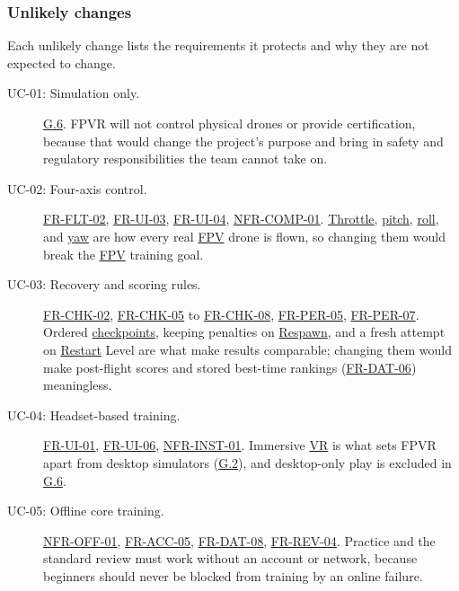 \documentclass[12pt]{article}
\begin{document}
\subsubsection*{Unlikely changes}

Each unlikely change lists the requirements it protects and why they are not
expected to change.

\begin{description}
\item[UC-01: Simulation only.] \hyperref[g6]{G.6}.
FPVR will not control physical drones or provide certification, because that
would change the project's purpose and bring in safety and regulatory
responsibilities the team cannot take on.
\item[UC-02: Four-axis control.]
\hyperlink{req:FR-FLT-02}{FR-FLT-02}, \hyperlink{req:FR-UI-03}{FR-UI-03},
\hyperlink{req:FR-UI-04}{FR-UI-04}, \hyperlink{req:NFR-COMP-01}{NFR-COMP-01}.
\hyperlink{glos:Throttle}{Throttle}, \hyperlink{glos:Throttle}{pitch}, \hyperlink{glos:Throttle}{roll}, and \hyperlink{glos:Throttle}{yaw} are how every real \hyperlink{glos:FPV}{FPV} drone is flown, so
changing them would break the \hyperlink{glos:FPV}{FPV} training goal.
\item[UC-03: Recovery and scoring rules.]
\hyperlink{req:FR-CHK-02}{FR-CHK-02}, \hyperlink{req:FR-CHK-05}{FR-CHK-05}
to \hyperlink{req:FR-CHK-08}{FR-CHK-08}, \hyperlink{req:FR-PER-05}{FR-PER-05},
\hyperlink{req:FR-PER-07}{FR-PER-07}.
Ordered \hyperlink{glos:Checkpoint}{checkpoints}, keeping penalties on \hyperlink{glos:Respawn}{Respawn}, and a fresh attempt on
\hyperlink{glos:Respawn}{Restart} Level are what make results comparable; changing them would make
post-flight scores and stored best-time rankings (\hyperlink{req:FR-DAT-06}{FR-DAT-06})
meaningless.
\item[UC-04: Headset-based training.]
\hyperlink{req:FR-UI-01}{FR-UI-01}, \hyperlink{req:FR-UI-06}{FR-UI-06},
\hyperlink{req:NFR-INST-01}{NFR-INST-01}.
Immersive \hyperlink{glos:VR}{VR} is what sets FPVR apart from desktop simulators
(\hyperref[g2]{G.2}), and desktop-only play is excluded in
\hyperref[g6]{G.6}.
\item[UC-05: Offline core training.]
\hyperlink{req:NFR-OFF-01}{NFR-OFF-01}, \hyperlink{req:FR-ACC-05}{FR-ACC-05},
\hyperlink{req:FR-DAT-08}{FR-DAT-08}, \hyperlink{req:FR-REV-04}{FR-REV-04}.
Practice and the standard review must work without an account or network,
because beginners should never be blocked from training by an online
failure.
\end{description}
\end{document}
